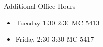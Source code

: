 

Additional Office Hours
\begin{itemize}
\item Tuesday 1:30-2:30 MC 5413
\item Friday 2:30-3:30 MC 5417
\end{itemize}

